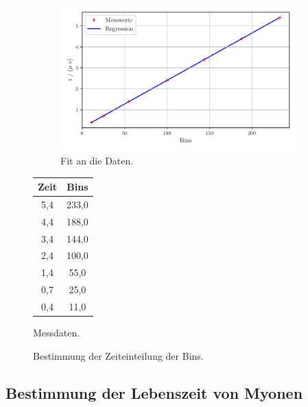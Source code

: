 \begin{figure}%
    \begin{subfigure}{0.68\textwidth}%
    \centering%
    \includegraphics[width=\textwidth]{build/zeiteinteilung.pdf}%
    \caption{Fit an die Daten.}%
    \label{fig:zeiteinteilung}%
    \end{subfigure}%
    \hfill%
    \begin{subtable}{0.28\textwidth}%
        \centering
        \begin{tabular}{c c}
        \toprule
        Zeit &  Bins \\
        \midrule
         5,4 & 233,0 \\
         4,4 & 188,0 \\
         3,4 & 144,0 \\
         2,4 & 100,0 \\
         1,4 &  55,0 \\
         0,7 &  25,0 \\
         0,4 &  11,0 \\
        \bottomrule
        \end{tabular}
        \caption{Messdaten.}
        \label{tab:zeiteinteilung}
    \end{subtable}%
    \caption{Bestimmung der Zeiteinteilung der Bins.}
    \label{subfig:zeiteinteilung}    
\end{figure}%
    
\subsection{Bestimmung der Lebenszeit von Myonen}

